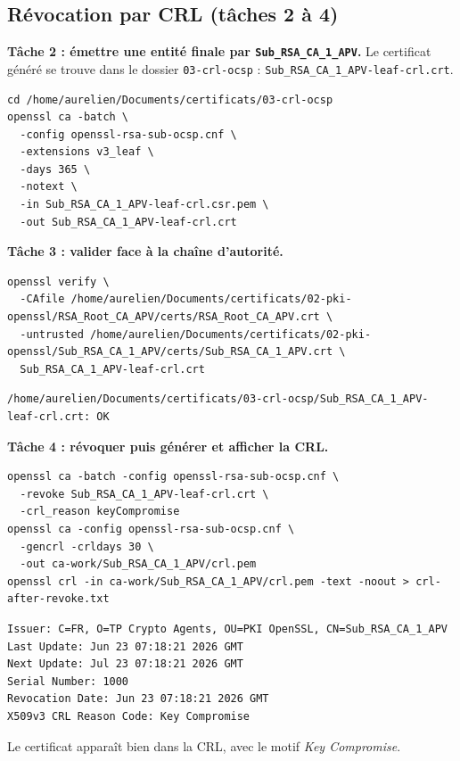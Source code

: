 \documentclass[11pt,a4paper]{article}
\newcommand{\tri}{\texttt{APV}}
\newcommand{\fichier}[1]{\texttt{#1}}
\begin{document}
\newpage

\subsection{Révocation par CRL (tâches 2 à 4)}

\textbf{Tâche 2 : émettre une entité finale par \texttt{Sub\_RSA\_CA\_1\_\tri}.}
Le certificat généré se trouve dans le dossier \fichier{03-crl-ocsp} :
\fichier{Sub\_RSA\_CA\_1\_\tri-leaf-crl.crt}.
\begin{lstlisting}[style=cmd]
cd /home/aurelien/Documents/certificats/03-crl-ocsp
openssl ca -batch \
  -config openssl-rsa-sub-ocsp.cnf \
  -extensions v3_leaf \
  -days 365 \
  -notext \
  -in Sub_RSA_CA_1_APV-leaf-crl.csr.pem \
  -out Sub_RSA_CA_1_APV-leaf-crl.crt
\end{lstlisting}

\textbf{Tâche 3 : valider face à la chaîne d'autorité.}
\begin{lstlisting}[style=cmd]
openssl verify \
  -CAfile /home/aurelien/Documents/certificats/02-pki-openssl/RSA_Root_CA_APV/certs/RSA_Root_CA_APV.crt \
  -untrusted /home/aurelien/Documents/certificats/02-pki-openssl/Sub_RSA_CA_1_APV/certs/Sub_RSA_CA_1_APV.crt \
  Sub_RSA_CA_1_APV-leaf-crl.crt
\end{lstlisting}
\begin{lstlisting}[style=out]
/home/aurelien/Documents/certificats/03-crl-ocsp/Sub_RSA_CA_1_APV-leaf-crl.crt: OK
\end{lstlisting}

\textbf{Tâche 4 : révoquer puis générer et afficher la CRL.}
\begin{lstlisting}[style=cmd]
openssl ca -batch -config openssl-rsa-sub-ocsp.cnf \
  -revoke Sub_RSA_CA_1_APV-leaf-crl.crt \
  -crl_reason keyCompromise
openssl ca -config openssl-rsa-sub-ocsp.cnf \
  -gencrl -crldays 30 \
  -out ca-work/Sub_RSA_CA_1_APV/crl.pem
openssl crl -in ca-work/Sub_RSA_CA_1_APV/crl.pem -text -noout > crl-after-revoke.txt
\end{lstlisting}
\begin{lstlisting}[style=out]
Issuer: C=FR, O=TP Crypto Agents, OU=PKI OpenSSL, CN=Sub_RSA_CA_1_APV
Last Update: Jun 23 07:18:21 2026 GMT
Next Update: Jul 23 07:18:21 2026 GMT
Serial Number: 1000
Revocation Date: Jun 23 07:18:21 2026 GMT
X509v3 CRL Reason Code: Key Compromise
\end{lstlisting}
Le certificat apparaît bien dans la CRL, avec le motif \emph{Key Compromise}.
\end{document}
